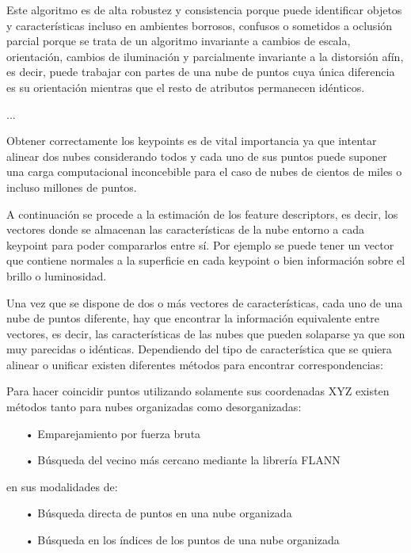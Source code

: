 Este algoritmo es de alta robustez y consistencia porque puede identificar objetos y características incluso en ambientes borrosos, confusos o sometidos a oclusión parcial porque se trata de un algoritmo invariante a cambios de escala, orientación, cambios de iluminación y parcialmente invariante a la distorsión afín, es decir, puede trabajar con partes de una nube de puntos cuya única diferencia es su orientación mientras que el resto de atributos permanecen idénticos.


...



Obtener correctamente los keypoints es de vital importancia ya que intentar alinear dos nubes considerando todos y cada uno de sus puntos puede suponer una carga computacional inconcebible para el caso de nubes de cientos de miles o incluso millones de puntos. 

A continuación se procede a la estimación de los feature descriptors, es decir, los vectores donde se almacenan las características de la nube entorno a cada keypoint para poder compararlos entre sí. Por ejemplo se puede tener un vector que contiene normales a la superficie en cada keypoint o bien información sobre el brillo o luminosidad.

Una vez que se dispone de dos o más vectores de características, cada uno de una nube de puntos diferente, hay que encontrar la información equivalente entre vectores, es decir, las características de las nubes que pueden solaparse ya que son muy parecidas o idénticas. Dependiendo del tipo de característica que se quiera alinear o unificar existen diferentes métodos para encontrar correspondencias:

Para hacer coincidir puntos utilizando solamente sus coordenadas XYZ existen métodos tanto para nubes organizadas como desorganizadas:
\begin{itemize}
\item[•]Emparejamiento por fuerza bruta
\item[•]Búsqueda del vecino más cercano mediante la librería FLANN
\end{itemize}
en sus modalidades de:
\begin{itemize}
\item[•]Búsqueda directa de puntos en una nube organizada
\item[•]Búsqueda en los índices de los puntos de una nube organizada
\end{itemize}

